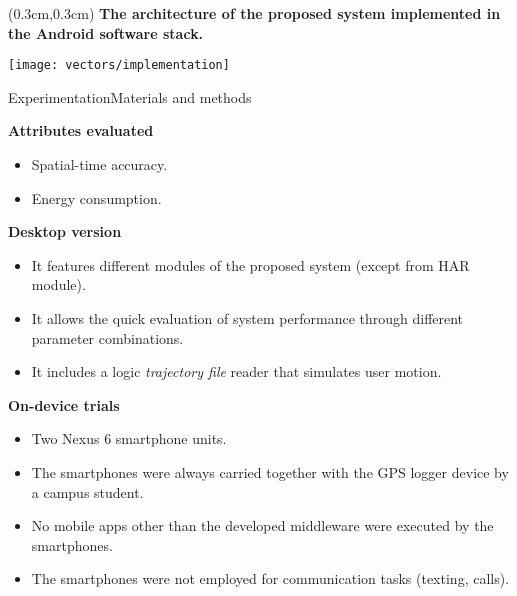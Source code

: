 {\aauwavesbg
  \begin{textblock*}{5cm}(0.3cm,0.3cm)
  \small
  \textbf{The architecture of the proposed system implemented in the Android software stack.}
  \end{textblock*}
\begin{frame}
  \centering
  \texttt{[image: vectors/implementation]}
\end{frame}}

\begin{frame}[noframenumbering]{Experimentation}{Materials and methods}
\small
\begin{block}{\small \textbf{Attributes evaluated}}
  \begin{itemize}
    \item Spatial-time accuracy.
    \item Energy consumption.
  \end{itemize}
\end{block}

\begin{block}{\small \textbf{Desktop version}}
  \begin{itemize}
    \item It features different modules of the proposed system (except from HAR module).
    \item It allows the quick evaluation of system performance through different parameter combinations.
    \item It includes a logic \emph{trajectory file} reader that simulates user motion.
  \end{itemize}
\end{block}

\begin{block}{\small \textbf{On-device trials}}
\begin{itemize}
  \item Two Nexus 6 smartphone units.
  \item The smartphones were always carried together with the GPS logger device by a campus student.
  \item No mobile apps other than the developed middleware were executed by the smartphones.
  \item The smartphones were not employed for communication tasks (texting, calls).
\end{itemize}
\end{block}
\end{frame}

